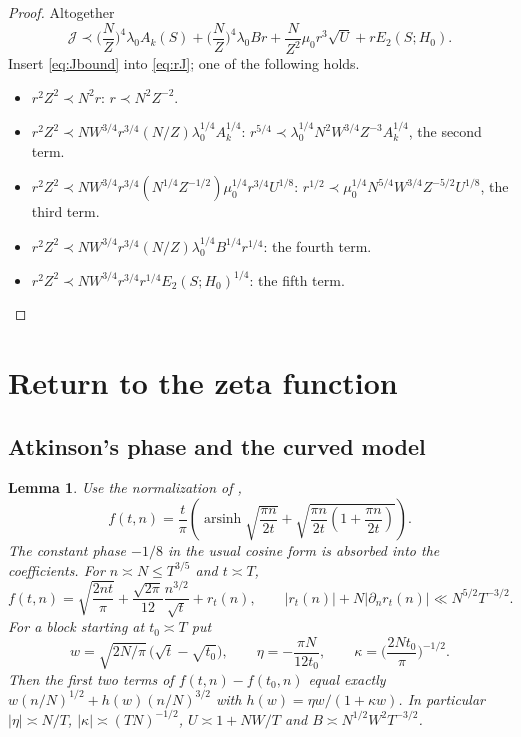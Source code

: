 \documentclass[11pt]{amsart}
\newtheorem{lemma}[theorem]{Lemma}
\theoremstyle{definition}
\theoremstyle{remark}
\numberwithin{equation}{section}
\newcommand{\cJ}{\mathcal{J}}
\begin{document}
\begin{proof}
Altogether
\begin{equation}\label{eq:Jbound}
\cJ\prec\Big(\frac NZ\Big)^4\lambda_0A_k(S)+\Big(\frac NZ\Big)^4\lambda_0Br+\frac N{Z^2}\mu_0r^3\sqrt U+rE_2(S;H_0).
\end{equation}
Insert \eqref{eq:Jbound} into \eqref{eq:rJ}; one of the following holds.
\begin{itemize}
\item $r^2Z^2\prec N^2r$: $r\prec N^2Z^{-2}$.
\item $r^2Z^2\prec NW^{3/4}r^{3/4}(N/Z)\lambda_0^{1/4}A_k^{1/4}$: $r^{5/4}\prec\lambda_0^{1/4}N^2W^{3/4}Z^{-3}A_k^{1/4}$, the second term.
\item $r^2Z^2\prec NW^{3/4}r^{3/4}(N^{1/4}Z^{-1/2})\mu_0^{1/4}r^{3/4}U^{1/8}$: $r^{1/2}\prec\mu_0^{1/4}N^{5/4}W^{3/4}Z^{-5/2}U^{1/8}$, the third term.
\item $r^2Z^2\prec NW^{3/4}r^{3/4}(N/Z)\lambda_0^{1/4}B^{1/4}r^{1/4}$: the fourth term.
\item $r^2Z^2\prec NW^{3/4}r^{3/4}r^{1/4}E_2(S;H_0)^{1/4}$: the fifth term.\qedhere
\end{itemize}
\end{proof}

\section{Return to the zeta function}\label{sec:return}

\subsection{Atkinson's phase and the curved model}

\begin{lemma}\label{lem:atkinson}
Use the normalization of \cite[(41)]{dFP},
\[
f(t,n)=\frac t\pi\left(\operatorname{arsinh}\sqrt{\frac{\pi n}{2t}}+
\sqrt{\frac{\pi n}{2t}\left(1+\frac{\pi n}{2t}\right)}\right).
\]
The constant phase $-1/8$ in the usual cosine form is absorbed into the coefficients. For $n\asymp N\le T^{3/5}$ and $t\asymp T$,
\[
f(t,n)=\sqrt{\frac{2nt}\pi}+\frac{\sqrt{2\pi}}{12}\frac{n^{3/2}}{\sqrt t}+r_t(n),\qquad
|r_t(n)|+N|\partial_nr_t(n)|\ll N^{5/2}T^{-3/2}.
\]
For a block starting at $t_0\asymp T$ put
\[
w=\sqrt{2N/\pi}\,\big(\sqrt t-\sqrt{t_0}\big),\qquad \eta=-\frac{\pi N}{12t_0},\qquad \kappa=\Big(\frac{2Nt_0}\pi\Big)^{-1/2}.
\]
Then the first two terms of $f(t,n)-f(t_0,n)$ equal exactly $w(n/N)^{1/2}+h(w)(n/N)^{3/2}$ with $h(w)=\eta w/(1+\kappa w)$. In particular $|\eta|\asymp N/T$, $|\kappa|\asymp(TN)^{-1/2}$, $U\asymp1+NW/T$ and $B\asymp N^{1/2}W^2T^{-3/2}$.
\end{lemma}
\end{document}
